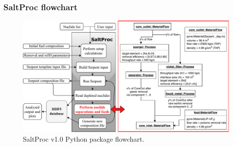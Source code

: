 \begin{frame}
\frametitle{SaltProc flowchart}
\vspace{-4mm}
\begin{figure}[ht!] %
	\centering
	\includegraphics[width=1.08\textwidth]{../dissertation/figures/ch2/saltproc_flowchart.pdf}
		\vspace{-4mm}
	\caption{SaltProc v1.0 Python package flowchart.}
\end{figure}

\end{frame}


